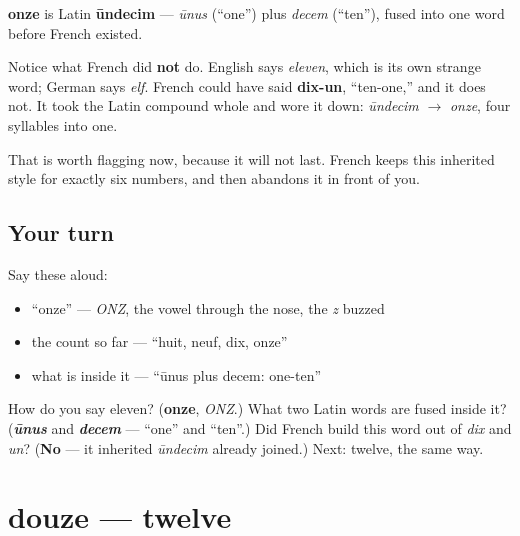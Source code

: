 \begin{cousinweb}
\textbf{onze} is Latin \textbf{ūndecim} — \emph{ūnus} (\textquotedblleft{}one\textquotedblright{}) plus \emph{decem} (\textquotedblleft{}ten\textquotedblright{}), fused into one word before French existed.

Notice what French did \textbf{not} do. English says \emph{eleven}, which is its own strange word; German says \emph{elf}. French could have said \textbf{dix-un}, \textquotedblleft{}ten-one,\textquotedblright{} and it does not. It took the Latin compound whole and wore it down: \emph{ūndecim} $\to$ \emph{onze}, four syllables into one.

That is worth flagging now, because it will not last. French keeps this inherited style for exactly six numbers, and then abandons it in front of you.
\end{cousinweb}

\subsection*{Your turn}
Say these aloud:

\begin{itemize}
\raggedright
  \item \textquotedblleft{}onze\textquotedblright{} — \emph{ONZ}, the vowel through the nose, the \emph{z} buzzed
  \item the count so far — \textquotedblleft{}huit, neuf, dix, onze\textquotedblright{}
  \item what is inside it — \textquotedblleft{}ūnus plus decem: one-ten\textquotedblright{}
\end{itemize}

\begin{tcolorbox}[breakable,colback=teal!4,colframe=teal!35!black,title={Before you move on}]
How do you say eleven? (\textbf{onze}, \emph{ONZ}.) What two Latin words are fused inside it? (\emph{\textbf{ūnus}} and \emph{\textbf{decem}} — \textquotedblleft{}one\textquotedblright{} and \textquotedblleft{}ten\textquotedblright{}.) Did French build this word out of \emph{dix} and \emph{un}? (\textbf{No} — it inherited \emph{ūndecim} already joined.) Next: twelve, the same way.
\end{tcolorbox}
\section[douze]{douze — twelve}

\label{lesson:FR-C12-douze}



